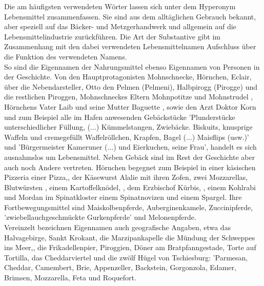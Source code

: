 Die am häufigsten verwendeten Wörter lassen sich unter dem Hyperonym Lebensmittel zusammenfassen. Sie sind aus dem alltäglichen Gebrauch bekannt, aber speziell auf das Bäcker- und Metzgerhandwerk und allgemein auf die Lebensmittelindustrie zurückführen. Die Art der Substantive gibt im Zusammenhang mit den dabei verwendeten Lebensmittelnamen Aufschluss über die Funktion des verwendeten Namens. 
\\
So sind die Eigennamen der Nahrungsmittel ebenso Eigennamen von Personen in der Geschichte. Von den Hauptprotagonisten Mohnschnecke,\cite[S.13ff]{pir} Hörnchen,\cite[S.25ff]{pir} Eclair,\cite[S.15ff]{pir} über die Nebendarsteller, Otto den Pelmen (Pelmeni),\cite[S.45ff]{pir} Halbpirogg (Pirogge) und die restlichen Piroggen,\cite[S.33ff]{pir} Mohnschneckes Eltern Mohnpotitze \cite[S.13]{pir} und Mohnstrudel \cite[S.13]{pir}, Hörnchens Vater Laib \cite[S.40]{pir} und seine Mutter Baguette \cite[S.63]{pir}, sowie den Arzt Doktor Korn \cite[S.39]{pir} und zum Beispiel alle im Hafen anwesenden Gebäckstücke 'Plunderstücke unterschiedlicher Füllung, (...) Kümmelstangen, Zwiebäcke. Biskuits, knusprige Waffeln und cremegefüllt Waffelröllchen, Krapfen, Bagel (...) Maisflips (usw.)'\cite[S.38]{pir} und 'Bürgermeister Kameruner (...) und Eierkuchen, seine Frau',\cite[S.189]{pir} handelt es sich ausnahmslos um Lebensmittel. Neben Gebäck sind im Rest der Geschichte aber auch noch Andere vertreten. Hörnchen begegnet zum Beispiel in einer käsischen Pizzeria einer Pizza,\cite[S.171]{pir}, der Käsewurst Alalie mit ihren Zofen, zwei Mozzarellas,\cite[S.179]{pir} Blutwürsten \cite[S.220ff]{pir}, einem Kartoffelknödel, \cite[S.223]{pir}, dem Erzbischof Kürbis, \cite[S.289]{pir}, einem Kohlrabi \cite[S.289]{pir} und Mordan im Spinatkloster einem Spinatnovizen \cite[S.400f]{pir} und einem Spargel.\cite[S.401]{pir} Ihre Fortbewegungsmittel sind Maiskolbenpferde, \cite[S.124]{pir}\cite[S.241]{pir} Auberginenkamele,\cite[S.126]{pir} Zuccinipferde, \cite[S.286]{pir} 'zwiebellauchgeschmückte Gurkenpferde' \cite[S.289]{pir} und Melonenpferde.\cite[S.291]{pir}
\\
Vereinzelt bezeichnen Eigennamen auch geografische Angaben, etwa das Halvagebirge,\cite[S.165]{pir} Sankt Krokant,\cite[S.19ff]{pir} die Marzipankapelle \cite[S.18]{pir} die Mündung der Schweppes ins Meer,\cite[S.187]{pir}, die Frikadellenpier,\cite[S.21]{pir} Piroggien,\cite[S.479ff]{pir} Döner am Bratpfanngestade, \cite[S.381]{pir} Torte auf Tortilla,\cite[S.405]{pir} das Cheddarviertel \cite[S.169]{pir} und die zwölf Hügel von Tschiesburg: \cite[S.165]{pir} 'Parmesan, Cheddar, Camembert, Brie, Appenzeller, Backstein, Gorgonzola, Edamer, Brimsen, Mozzarella, Feta und Roquefort.\cite[S.165]{pir}

